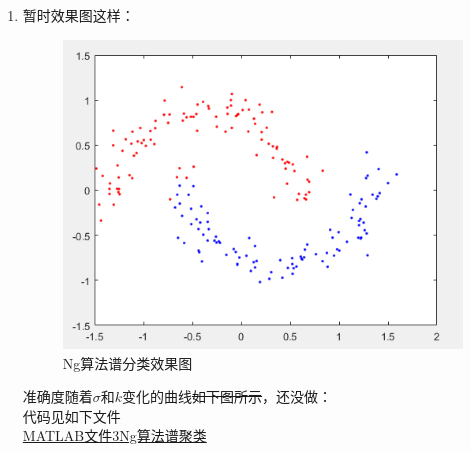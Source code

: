 \documentclass[a4paper,11pt,onecolumn,oneside,UTF8]{article}
\begin{document}
\begin{enumerate}
      \item
            暂时效果图这样：\\
            \begin{figure}[H]
                  \centering
                  \includegraphics[width=.8\textwidth]{hw5_4.png}
                  \caption{ Ng算法谱分类效果图 }
                  \label{img4}
            \end{figure}
            准确度随着$\sigma$和$k$变化的曲线\sout{如下图所示}，还没做：\\
            代码见如下文件\\
            \href{https://github.com/Allenem/PatternRecognition/blob/main/hw5/PR_hw5_2.m}{MATLAB文件3Ng算法谱聚类}
\end{enumerate}
\end{document}
